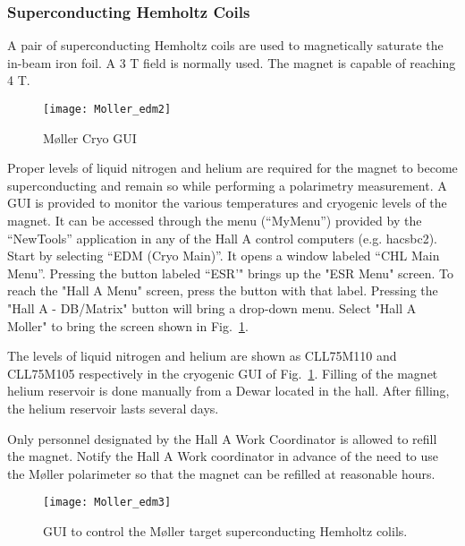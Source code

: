 {\subsubsection{Superconducting Hemholtz Coils}\label{SHC_sssection}

A pair of superconducting Hemholtz coils are used to magnetically saturate the in-beam iron foil.
A 3 T field is normally used. The magnet is capable of reaching 4 T.

   \begin{figure}%
      \begin{center}
          \texttt{[image: Moller\_edm2]}
      \end{center}
      \caption[M{\o}ller: Cryo GUI]{M{\o}ller Cryo GUI}
      \label{fig:Moller_edm2} 
   \end{figure}  

Proper levels of liquid nitrogen and helium are required for the magnet to become superconducting
and remain so while performing a polarimetry measurement. A GUI is provided to monitor
the various temperatures and cryogenic levels of the magnet. It can be accessed
through the menu (``MyMenu'')
provided by the ``NewTools'' application in any of the Hall A
control computers (e.g. hacsbc2). Start by selecting ``EDM (Cryo Main)''.
It opens a window labeled ``CHL Main Menu''.
Pressing the button labeled ``ESR'" brings up the "ESR Menu" screen.
To reach the "Hall A Menu" screen, press the button with that label.
Pressing the "Hall A - DB/Matrix" button will bring a drop-down menu. Select "Hall A Moller"
to bring the screen shown in Fig.~\ref{fig:Moller_edm2}.

The levels of liquid nitrogen and helium are shown as CLL75M110 and CLL75M105 respectively in the cryogenic GUI
of Fig.~\ref{fig:Moller_edm2}. Filling of the magnet helium reservoir is done manually from a Dewar
located in the hall. After filling, the helium reservoir lasts several days.
 \begin{safetyen}{0}{0}
 Only personnel designated by the Hall A Work Coordinator is allowed to refill the magnet.
 Notify the Hall A Work coordinator in advance of the need to use the M{\o}ller polarimeter 
 so that the magnet can be refilled at reasonable hours.
 \end{safetyen} 

   \begin{figure}[htb]
      \begin{center}
          \texttt{[image: Moller\_edm3]}
      \end{center}
      \caption[M{\o}ller: control of Hemholtz coils.]{GUI to control the M{\o}ller target superconducting
      Hemholtz colils.}
      \label{fig:Moller_edm3} 
   \end{figure}
   
}
